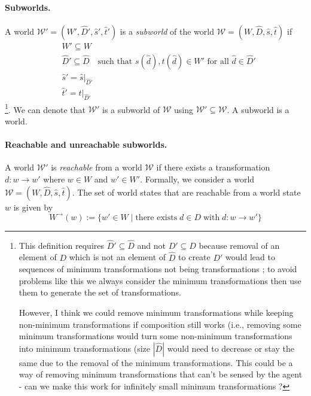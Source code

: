 \paragraph{Subworlds.}
A world $\mathscr{W}' = (W', \hat{D}', \hat{s}', \hat{t}')$ is a \emph{subworld} of the world $\mathscr{W} = (W, \hat{D}, \hat{s}, \hat{t})$ if
\begin{align}
    & W' \subseteq W \\
    & \hat{D}' \subseteq \hat{D} \quad \text{such that $s(\hat{d}), t(\hat{d}) \in W'$ for all $\hat{d} \in \hat{D}'$} \\
    & \hat{s}' = \hat{s} \big|_{\hat{D}'} \\
    & \hat{t}' = \hat{t} \big|_{\hat{D}'}
\end{align}
\footnote{
	This definition requires $\hat{D}' \subseteq \hat{D}$ and not $D' \subseteq D$ because removal of an element of $D$ which is not an element of $\hat{D}$ to create $D'$ would lead to sequences of minimum transformations not being transformations
    ; to avoid problems like this we always consider the minimum transformations then use them to generate the set of transformations.

    However, I think we could remove minimum transformations while keeping non-minimum transformations if composition still works (i.e., removing some minimum transformations would turn some non-minimum transformations into minimum transformations (size $|\hat{D}|$ would need to decrease or stay the same due to the removal of the minimum transformations.
    This could be a way of removing minimum transformations that can't be sensed by the agent - can we make this work for infinitely small minimum transformations ?
}.
We can denote that $\mathscr{W}'$ is a subworld of $\mathscr{W}$ using $\mathscr{W}' \subseteq \mathscr{W}$.
A subworld is a world.

\paragraph{Reachable and unreachable subworlds.}
A world $\mathscr{W}'$ is \emph{reachable} from a world $\mathscr{W}$ if there exists a transformation $d: w \to w'$ where $w \in W$ and $w' \in W'$.
Formally, we consider a world $\mathscr{W} = (W, \hat{D}, \hat{s}, \hat{t})$.
The set of world states that are reachable from a world state $w$ is given by
\begin{equation}
    W^{\to}(w) := \{ w' \in W \mid \text{there exists} \; d \in D \; \text{with} \; d: w \to w' \}
\end{equation}

